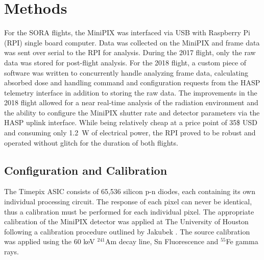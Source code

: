 \section{Methods}
\label{Methods}
For the SORA flights, the MiniPIX was interfaced via USB with Raspberry Pi (RPI) single board computer. Data was collected on the MiniPIX and frame data was sent over serial to the RPI for analysis. During the 2017 flight, only the raw data was stored for post-flight analysis. For the 2018 flight, a custom piece of software was written to concurrently handle analyzing frame data, calculating absorbed dose and handling command and configuration requests from the HASP telemetry interface in addition to storing the raw data. The improvements in the 2018 flight allowed for a near real-time analysis of the radiation environment and the ability to configure the MiniPIX shutter rate and detector parameters via the HASP uplink interface. While being relatively cheap at a price point of 35\$ USD and consuming only \SI{1.2}{\watt} of electrical power, the RPI proved to be robust and operated without glitch for the duration of both flights.


\subsection{Configuration and Calibration}
The Timepix ASIC consists of 65,536 silicon p-n diodes, each containing its own individual processing circuit. The response of each pixel can never be identical, thus a calibration must be performed for each individual pixel. The appropriate calibration of the MiniPIX detector was applied at The University of Houston following a calibration procedure outlined by Jakubek \cite{mpjakubek}. The source calibration was applied using the 60 keV $^{241}$Am decay line, Sn Fluorescence and $^{55}$Fe gamma rays.

